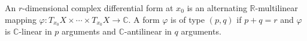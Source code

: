 An $r$-dimensional complex differential form at $x_0$ is an alternating $\mathbb{R}$-multilinear mapping $\varphi: T_{x_0}X \times \cdots \times T_{x_0}X \to \mathbb{C}$. A form $\varphi$ is of type $(p, q)$ if $p+q = r$ and $\varphi$ is $\mathbb{C}$-linear in $p$ arguments and $\mathbb{C}$-antilinear in $q$ arguments.
